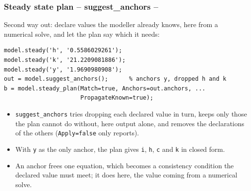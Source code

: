 \documentclass[10pt,slidestop]{beamer}
\theoremstyle{plain}
\begin{document}
\begin{frame}[fragile]
  \frametitle{Steady state plan -- suggest\_anchors --}

  Second way out: declare values the modeller already knows, here from a numerical
  solve, and let the plan say which it needs:

  \begin{lstlisting}[style=MatlabConsole,basicstyle=\ttfamily\scriptsize]
model.steady('h', '0.5586029261');
model.steady('k', '21.2209081886');
model.steady('y', '1.9690980908');
out = model.suggest_anchors();      % anchors y, dropped h and k
b = model.steady_plan(Match=true, Anchors=out.anchors, ...
                      PropagateKnown=true);
  \end{lstlisting}

  \begin{itemize}\small
  \item \verb+suggest_anchors+ tries dropping each declared value in turn, keeps only
    those the plan cannot do without, here output alone, and removes the
    declarations of the others (\verb+Apply=false+ only reports).
  \item With \verb+y+ as the only anchor, the plan gives \verb+i+, \verb+h+,
    \verb+c+ and \verb+k+ in closed form.
  \item An anchor frees one equation, which becomes a consistency condition the
    declared value must meet; it does here, the value coming from a numerical
    solve.
  \end{itemize}

\end{frame}
\end{document}
